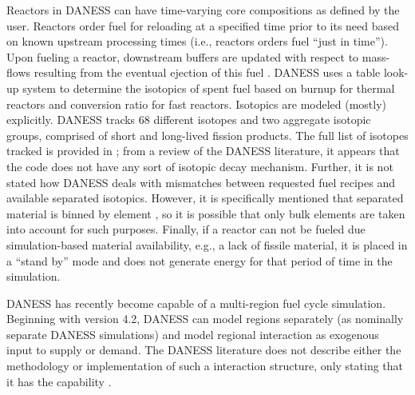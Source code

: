 Reactors in DANESS can have time-varying core compositions as defined by the
user. Reactors order fuel for reloading at a specified time prior to its need
based on known upstream processing times (i.e., reactors orders fuel ``just in
time''). Upon fueling a reactor, downstream buffers are updated with respect to
mass-flows resulting from the eventual ejection of this fuel
\cite{guerin_benchmark_2009}. DANESS uses a table look-up system to determine the
isotopics of spent fuel based on burnup for thermal reactors and conversion
ratio for fast reactors. Isotopics are modeled (mostly) explicitly. DANESS
tracks 68 different isotopes and two aggregate isotopic groups, comprised of
short and long-lived fission products. The full list of isotopes tracked is
provided in \cite{van_den_durpel_daness_2009}; from a review of the DANESS
literature, it appears that the code does not have any sort of isotopic decay
mechanism. Further, it is not stated how DANESS deals with mismatches between
requested fuel recipes and available separated isotopics. However, it is
specifically mentioned that separated material is binned by element
\cite{van_den_durpel_daness_2009}, so it is possible that only bulk elements are
taken into account for such purposes. Finally, if a reactor can not be fueled
due simulation-based material availability, e.g., a lack of fissile material, it
is placed in a ``stand by'' mode and does not generate energy for that period of
time in the simulation.

DANESS has recently become capable of a multi-region fuel cycle simulation.
Beginning with version 4.2, DANESS can model regions separately (as nominally
separate DANESS simulations) and model regional interaction as exogenous input
to supply or demand. The DANESS literature does not describe either the
methodology or implementation of such a interaction structure, only stating that
it has the capability \cite{van_den_durpel_daness_2009}.
